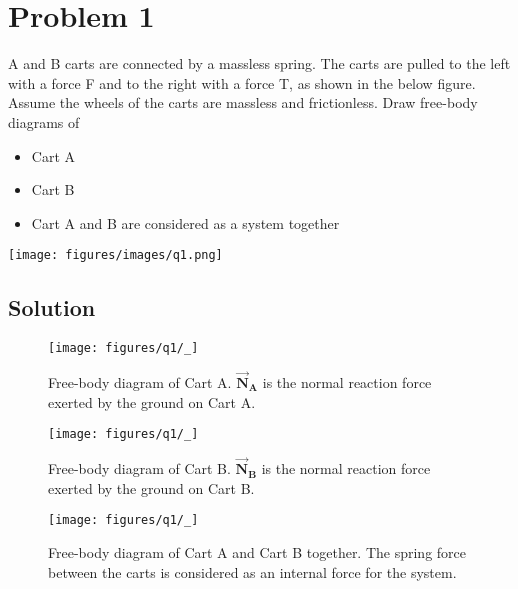 \section*{Problem 1}

A and B carts are connected by a massless spring.
The carts are pulled to the left with a force F and to the right with a force T, as shown in the below figure.
Assume the wheels of the carts are massless and frictionless.
Draw free-body diagrams of
\begin{itemize}[itemsep=3pt,parsep=0pt,topsep=5pt,partopsep=0pt]
    \item Cart A
    \item Cart B
    \item Cart A and B are considered as a system together
\end{itemize}

\begin{figure*}[h]
    \centering
    \texttt{[image: figures/images/q1.png]}
\end{figure*}

\subsection*{Solution}

\begin{figure}[htbp]
    \centering
    \texttt{[image: figures/q1/\_]}
    \caption{
        Free-body diagram of Cart A.
        \( \vec{\mathbf{N}}_{\mathbf{A}} \) is the normal reaction force exerted by the ground on Cart A.
    }
\end{figure}

\begin{figure}[htbp]
    \centering
    \texttt{[image: figures/q1/\_]}
    \caption{
        Free-body diagram of Cart B.
        \( \vec{\mathbf{N}}_{\mathbf{B}} \) is the normal reaction force exerted by the ground on Cart B.
    }
\end{figure}

\begin{figure}[htbp]
    \centering
    \texttt{[image: figures/q1/\_]}
    \caption{
        Free-body diagram of Cart A and Cart B together.
        The spring force between the carts is considered as an internal force for the system.
    }
\end{figure}
